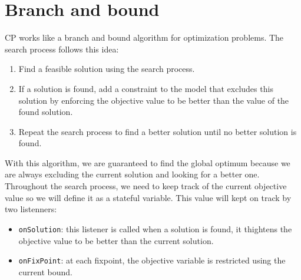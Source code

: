 \documentclass[12pt, openany]{report}
\theoremstyle{definition}
\begin{document}
\section{Branch and bound}
CP works like a branch and bound algorithm for optimization problems. The search process follows this idea:
\begin{enumerate}
    \item Find a feasible solution using the search process.
    \item If a solution is found, add a constraint to the model that excludes this solution by enforcing the objective value to be better than the value of the found solution.
    \item Repeat the search process to find a better solution until no better solution is found.
\end{enumerate}
With this algorithm, we are guaranteed to find the global optimum because we are always excluding the current solution and looking for a better one.\\ 
Throughout the search process, we need to keep track of the current objective value so we will define it as a stateful variable. This value will kept on track by two listenners:
\begin{itemize}
    \item \texttt{onSolution}: this listener is called when a solution is found, it thightens the objective value to be better than the current solution.
    \item \texttt{onFixPoint}: at each fixpoint, the objective variable is restricted using the current bound.
\end{itemize}
\end{document}
